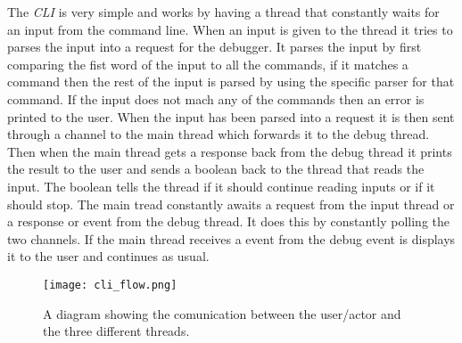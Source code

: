 The \emph{CLI} is very simple and works by having a thread that constantly waits for an input from the command line.
When an input is given to the thread it tries to parses the input into a request for the debugger.
It parses the input by first comparing the fist word of the input to all the commands, if it matches a command then the rest of the input is parsed by using the specific parser for that command.
If the input does not mach any of the commands then an error is printed to the user.
When the input has been parsed into a request it is then sent through a channel to the main thread which forwards it to the debug thread.
Then when the main thread gets a response back from the debug thread it prints the result to the user and sends a boolean back to the thread that reads the input.
The boolean tells the thread if it should continue reading inputs or if it should stop.
The main tread constantly awaits a request from the input thread or a response or event from the debug thread.
It does this by constantly polling the two channels.
If the main thread receives a event from the debug event is displays it to the user and continues as usual.


\begin{figure}[h]
	\centering
	\texttt{[image: cli\_flow.png]}
	\caption{A diagram showing the comunication between the user/actor and the three different threads.}
	\label{fig:cliflow}
\end{figure}

